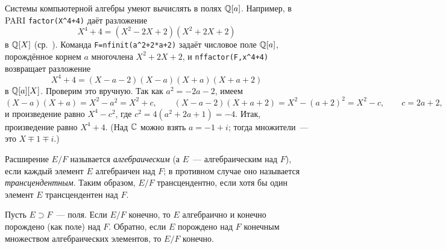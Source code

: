 \begin{remark}[1.29]
Системы компьютерной алгебры умеют вычислять в полях $\mathbb Q[a]$. Например, в PARI \texttt{factor(X\^{}4+4)} даёт разложение
\[
X^4+4=(X^2-2X+2)(X^2+2X+2)
\]
в $\mathbb Q[X]$ (ср.\ ). Команда \texttt{F=nfinit(a\^{}2+2*a+2)} задаёт числовое поле $\mathbb Q[a]$, порождённое корнем $a$ многочлена
$X^2+2X+2$, и \texttt{nffactor(F,x\^{}4+4)} возвращает разложение
\[
X^4+4=(X-a-2)(X-a)(X+a)(X+a+2)
\]
в $\mathbb Q[a][X]$. Проверим это вручную. Так как $a^2=-2a-2$, имеем
\[
(X-a)(X+a)=X^2-a^2=X^2+c,\qquad (X-a-2)(X+a+2)=X^2-(a+2)^2=X^2-c,\qquad c=2a+2,
\]
и произведение равно $X^4-c^2$, где $c^2=4(a^2+2a+1)=-4$. Итак, произведение равно $X^4+4$. (Над $\mathbb C$ можно взять
$a=-1+i$; тогда множители~--- это $X\mp1\mp i$.)
\end{remark}

Расширение $E/F$ называется \emph{алгебраическим} (а $E$~--- алгебраическим над $F$), если каждый элемент $E$ алгебраичен
над $F$; в противном случае оно называется \emph{трансцендентным}. Таким образом, $E/F$ трансцендентно, если хотя бы один
элемент $E$ трансцендентен над $F$.

\begin{proposition}[1.30]
Пусть $E\supset F$~--- поля. Если $E/F$ конечно, то $E$ алгебраично и конечно порождено (как поле) над $F$. Обратно, если
$E$ порождено над $F$ конечным множеством алгебраических элементов, то $E/F$ конечно.
\end{proposition}

